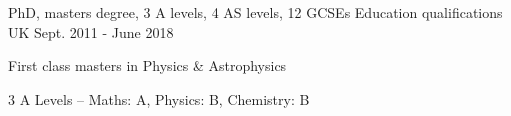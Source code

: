 \begin{cventries}
    
  \cventry
    {PhD, masters degree, 3 A levels, 4 AS levels, 12 GCSEs}
    {Education qualifications}
    {UK}
    {Sept. 2011 - June 2018}
    {
      \begin{cvitems}
        \item {First class masters in Physics \& Astrophysics}
      	\item {3 A Levels -- Maths: A, Physics: B, Chemistry: B}
      \end{cvitems}
    }
\end{cventries}
